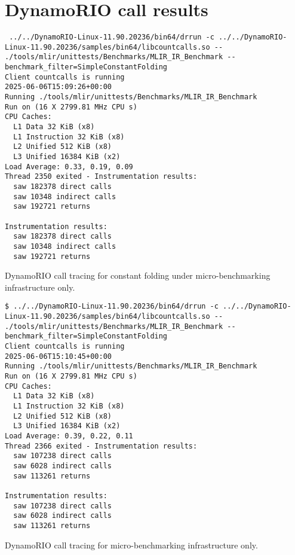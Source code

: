 \chapter{DynamoRIO call results}
\label{chap:dynamorio-calls}


\begin{code}
    \begin{verbatim}
 ../../DynamoRIO-Linux-11.90.20236/bin64/drrun -c ../../DynamoRIO-Linux-11.90.20236/samples/bin64/libcountcalls.so -- ./tools/mlir/unittests/Benchmarks/MLIR_IR_Benchmark --benchmark_filter=SimpleConstantFolding
Client countcalls is running
2025-06-06T15:09:26+00:00
Running ./tools/mlir/unittests/Benchmarks/MLIR_IR_Benchmark
Run on (16 X 2799.81 MHz CPU s)
CPU Caches:
  L1 Data 32 KiB (x8)
  L1 Instruction 32 KiB (x8)
  L2 Unified 512 KiB (x8)
  L3 Unified 16384 KiB (x2)
Load Average: 0.33, 0.19, 0.09
Thread 2350 exited - Instrumentation results:
  saw 182378 direct calls
  saw 10348 indirect calls
  saw 192721 returns

Instrumentation results:
  saw 182378 direct calls
  saw 10348 indirect calls
  saw 192721 returns
    \end{verbatim}
    \caption{DynamoRIO call tracing for constant folding under micro-benchmarking infrastructure only.}
    \label{listing:dynamorio-calls-workload}
\end{code}


\vspace{2em}
\begin{code}
    \begin{verbatim}
$ ../../DynamoRIO-Linux-11.90.20236/bin64/drrun -c ../../DynamoRIO-Linux-11.90.20236/samples/bin64/libcountcalls.so -- ./tools/mlir/unittests/Benchmarks/MLIR_IR_Benchmark --benchmark_filter=SimpleConstantFolding
Client countcalls is running
2025-06-06T15:10:45+00:00
Running ./tools/mlir/unittests/Benchmarks/MLIR_IR_Benchmark
Run on (16 X 2799.81 MHz CPU s)
CPU Caches:
  L1 Data 32 KiB (x8)
  L1 Instruction 32 KiB (x8)
  L2 Unified 512 KiB (x8)
  L3 Unified 16384 KiB (x2)
Load Average: 0.39, 0.22, 0.11
Thread 2366 exited - Instrumentation results:
  saw 107238 direct calls
  saw 6028 indirect calls
  saw 113261 returns

Instrumentation results:
  saw 107238 direct calls
  saw 6028 indirect calls
  saw 113261 returns
    \end{verbatim}
    \caption{DynamoRIO call tracing for micro-benchmarking infrastructure only.}
    \label{listing:dynamorio-calls-baseline}
\end{code}
